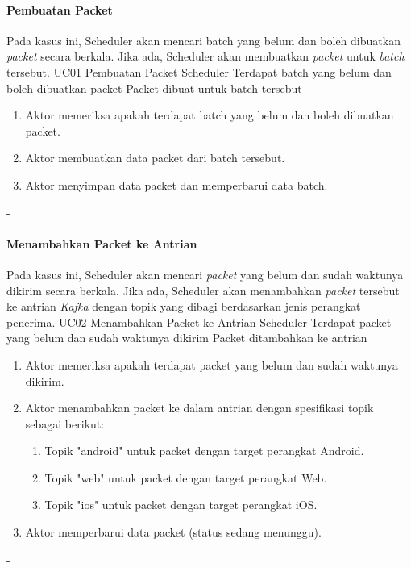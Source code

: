 \paragraph{Pembuatan Packet}
\par Pada kasus ini, Scheduler akan mencari batch yang belum dan boleh dibuatkan \textit{packet} secara berkala. Jika ada, Scheduler akan membuatkan \textit{packet} untuk \textit{batch} tersebut.
\tableUcDesc
{UC01}
{Pembuatan Packet}
{Scheduler}
{Terdapat batch yang belum dan boleh dibuatkan packet}
{Packet dibuat untuk batch tersebut}
{
\begin{enumerate}
    \item Aktor memeriksa apakah terdapat batch yang belum dan boleh dibuatkan packet.
    \item Aktor membuatkan data packet dari batch tersebut.
    \item Aktor menyimpan data packet dan memperbarui data batch.
\end{enumerate}
}
{-}

\paragraph{Menambahkan Packet ke Antrian}
\par Pada kasus ini, Scheduler akan mencari \textit{packet} yang belum dan sudah waktunya dikirim secara berkala. Jika ada, Scheduler akan menambahkan \textit{packet} tersebut ke antrian \textit{Kafka} dengan topik yang dibagi berdasarkan jenis perangkat penerima.
\tableUcDesc
{UC02}
{Menambahkan Packet ke Antrian}
{Scheduler}
{Terdapat packet yang belum dan sudah waktunya dikirim}
{Packet ditambahkan ke antrian}
{
\begin{enumerate}
    \item Aktor memeriksa apakah terdapat packet yang belum dan sudah waktunya dikirim.
    \item Aktor menambahkan packet ke dalam antrian dengan spesifikasi topik sebagai berikut:
    \begin{enumerate}
        \item Topik "android" untuk packet dengan target perangkat Android.
        \item Topik "web" untuk packet dengan target perangkat Web.
        \item Topik "ios" untuk packet dengan target perangkat iOS.
    \end{enumerate}
    \item Aktor memperbarui data packet (status sedang menunggu).
\end{enumerate}
}
{-}

